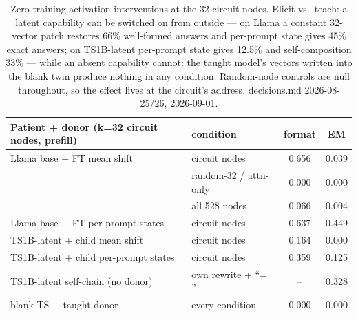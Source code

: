 \begin{table}[t]
\centering
\begin{tabular}{llcc}
\hline
Patient + donor (k=32 circuit nodes, prefill) & condition & format & EM \\
\hline
Llama base + FT mean shift & circuit nodes & 0.656 & 0.039 \\
 & random-32 / attn-only & 0.000 & 0.000 \\
 & all 528 nodes & 0.066 & 0.004 \\
Llama base + FT per-prompt states & circuit nodes & 0.637 & 0.449 \\
TS1B-latent + child mean shift & circuit nodes & 0.164 & 0.000 \\
TS1B-latent + child per-prompt states & circuit nodes & 0.359 & 0.125 \\
TS1B-latent self-chain (no donor) & own rewrite + ``= '' & -- & 0.328 \\
blank TS + taught donor & every condition & 0.000 & 0.000 \\
\hline
\end{tabular}
\caption{Zero-training activation interventions at the 32 circuit nodes. Elicit vs.\ teach: a latent capability can be switched on from outside --- on Llama a constant 32-vector patch restores 66\% well-formed answers and per-prompt state gives 45\% exact answers; on TS1B-latent per-prompt state gives 12.5\% and self-composition 33\% --- while an absent capability cannot: the taught model's vectors written into the blank twin produce nothing in any condition. Random-node controls are null throughout, so the effect lives at the circuit's address. decisions.md 2026-08-25/26, 2026-09-01.}
\label{tab:steering}
\end{table}
